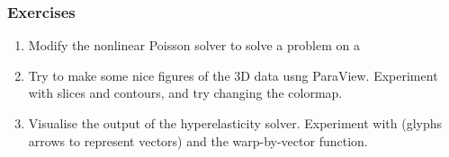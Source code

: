 \begin{frame}[fragile]
\frametitle{Exercises}

\begin{enumerate}
  \item Modify the nonlinear Poisson solver to solve a problem on a 

  \item Try to make some nice figures of the 3D data usng ParaView. Experiment with slices and contours, and try changing the colormap.

  \item Visualise the output of the hyperelasticity solver. Experiment with (glyphs arrows to represent vectors) and the warp-by-vector function.

\end{enumerate}

\end{frame}


